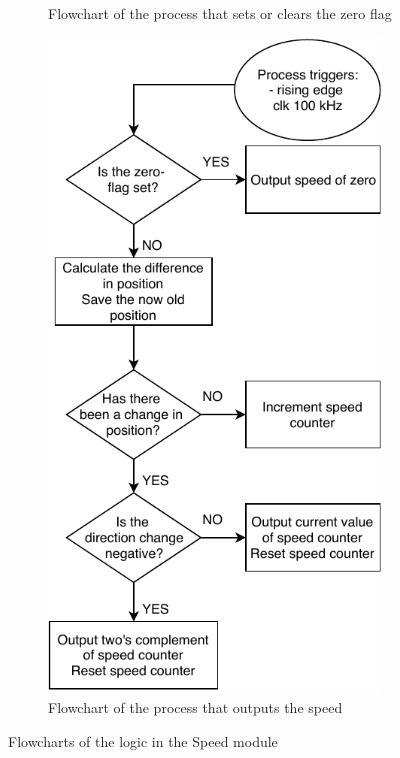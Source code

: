 \documentclass[../../main.tex]{subfiles}
\begin{document}
\begin{figure}[h]
\begin{subfigure}{0.48\textwidth}
    \caption{Flowchart of the process that sets or clears the zero flag}
    \label{subfig:FPGAProcessSpeedZeroFlowchart}
\end{subfigure}\quad
\begin{subfigure}{0.48\textwidth}
    \includegraphics[width = 0.97\textwidth]{Sections/System_Implementation/Images/FPGAProcessSpeedOutputFlowchart.pdf}
    \caption{Flowchart of the process that outputs the speed}
    \label{subfig:FPGAProcessSpeedZeroFlowchart}
\end{subfigure}
\caption{Flowcharts of the logic in the Speed module}
\label{fig:FPGAProcessSpeedFlowcharts}
\end{figure}
\end{document}
